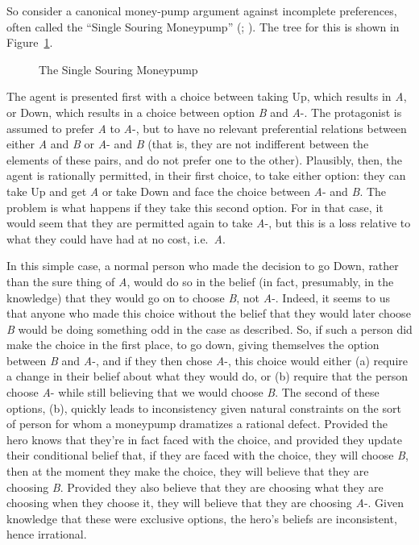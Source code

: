 \documentclass[
  11pt,
  letterpaper,
  DIV=11,
  numbers=noendperiod,
  twoside]{scrartcl}
\makeatletter
\newcommand*\pandocbounded[1]{%
  \sbox\pandoc@box{#1}%
  \Gscale@div\@tempa{\textheight}{\dimexpr\ht\pandoc@box+\dp\pandoc@box\relax}%
  \Gscale@div\@tempb{\linewidth}{\wd\pandoc@box}%
  \ifdim\@tempb\p@<\@tempa\p@\let\@tempa\@tempb\fi%
  \ifdim\@tempa\p@<\p@\scalebox{\@tempa}{\usebox\pandoc@box}%
  \else\usebox{\pandoc@box}%
  \fi%
}
\makeatother
\begin{document}
So consider a canonical money-pump argument against incomplete
preferences, often called the ``Single Souring Moneypump''
(;
). The tree for this
is shown in Figure~\ref{fig-single-souring}.

\begin{figure}

\centering{

\pandocbounded{\texttt{[image: moneypump\_files/figure-pdf/fig-single-souring-1.pdf]}}

}

\caption{\label{fig-single-souring}The Single Souring Moneypump}

\end{figure}%

The agent is presented first with a choice between taking Up, which
results in \emph{A}, or Down, which results in a choice between option
\emph{B} and \emph{A}-. The protagonist is assumed to prefer \emph{A} to
\emph{A}-, but to have no relevant preferential relations between either
\emph{A} and \emph{B} or \emph{A}- and \emph{B} (that is, they are not
indifferent between the elements of these pairs, and do not prefer one
to the other). Plausibly, then, the agent is rationally permitted, in
their first choice, to take either option: they can take Up and get
\emph{A} or take Down and face the choice between \emph{A}- and
\emph{B}. The problem is what happens if they take this second option.
For in that case, it would seem that they are permitted again to take
\emph{A}-, but this is a loss relative to what they could have had at no
cost, i.e.~\emph{A}.

In this simple case, a normal person who made the decision to go Down,
rather than the sure thing of \emph{A}, would do so in the belief (in
fact, presumably, in the knowledge) that they would go on to choose
\emph{B}, not \emph{A}-. Indeed, it seems to us that anyone who made
this choice without the belief that they would later choose \emph{B}
would be doing something odd in the case as described. So, if such a
person did make the choice in the first place, to go down, giving
themselves the option between \emph{B} and \emph{A}-, and if they then
chose \emph{A}-, this choice would either (a) require a change in their
belief about what they would do, or (b) require that the person choose
\emph{A}- while still believing that we would choose \emph{B}. The
second of these options, (b), quickly leads to inconsistency given
natural constraints on the sort of person for whom a moneypump
dramatizes a rational defect. Provided the hero knows that they're in
fact faced with the choice, and provided they update their conditional
belief that, if they are faced with the choice, they will choose
\emph{B}, then at the moment they make the choice, they will believe
that they are choosing \emph{B}. Provided they also believe that they
are choosing what they are choosing when they choose it, they will
believe that they are choosing \emph{A}-. Given knowledge that these
were exclusive options, the hero's beliefs are inconsistent, hence
irrational.
\end{document}
